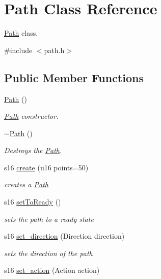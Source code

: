 \hypertarget{class_path}{}\section{Path Class Reference}
\label{class_path}


\mbox{\hyperlink{class_path}{Path}} class.  




{\ttfamily \#include $<$path.\+h$>$}

\subsection*{Public Member Functions}
\begin{DoxyCompactItemize}
\item 
\mbox{\hyperlink{class_path_af26cfab021ddf49af73da3b2beca85ac}{Path}} ()
\begin{DoxyCompactList}\small\item\em \mbox{\hyperlink{class_path}{Path}} constructor. \end{DoxyCompactList}\item 
\mbox{\hyperlink{class_path_a141da9ff89c85e0ba410b5a73864c267}{$\sim$\+Path}} ()
\begin{DoxyCompactList}\small\item\em Destroys the \mbox{\hyperlink{class_path}{Path}}. \end{DoxyCompactList}\item 
s16 \mbox{\hyperlink{class_path_a04a6c286852f3b7f53a187e25b38f3ec}{create}} (u16 points=50)
\begin{DoxyCompactList}\small\item\em creates a \mbox{\hyperlink{class_path}{Path}} \end{DoxyCompactList}\item 
s16 \mbox{\hyperlink{class_path_a8337c002364b617cec92d1d141592847}{set\+To\+Ready}} ()
\begin{DoxyCompactList}\small\item\em sets the path to a ready state \end{DoxyCompactList}\item 
s16 \mbox{\hyperlink{class_path_a7569f8a9cfbba8324ea9029db7afe7fc}{set\+\_\+direction}} (Direction direction)
\begin{DoxyCompactList}\small\item\em sets the direction of the path \end{DoxyCompactList}\item 
s16 \mbox{\hyperlink{class_path_a94fc077d91eb4440744713303309fe4d}{set\+\_\+action}} (Action action)

\end{DoxyCompactItemize}
